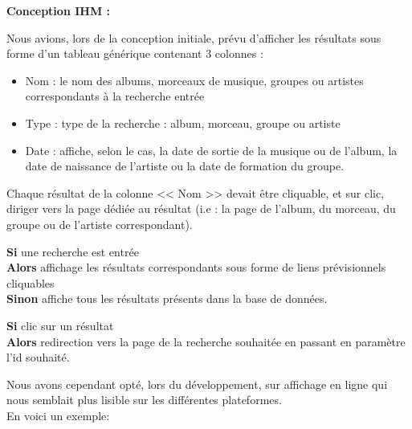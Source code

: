 			\begin{paragraphe}
				\textbf{Conception IHM :}
			\end{paragraphe}

			\begin{paragraphe}
			    Nous avions, lors de la conception initiale, prévu d'afficher les résultats sous forme d'un tableau générique contenant 3 colonnes :
				\begin{itemize}
					\item Nom : le nom des albums, morceaux de musique, groupes ou artistes correspondants à la recherche entrée
					\item Type : type de la recherche : album, morceau, groupe ou artiste
					\item Date : affiche, selon le cas, la date de sortie de la musique ou de l'album, la date de naissance de l'artiste ou la date de formation du groupe.
				\end{itemize}
				Chaque résultat de la colonne << Nom >> devait être cliquable, et sur clic, diriger vers la page dédiée au résultat (i.e : la page de l'album, du morceau, du groupe ou de l'artiste correspondant).
			\end{paragraphe}
            

            \begin{paragraphe}
                \textbf{Si} une recherche est entrée\\
                \textbf{Alors} affichage les résultats correspondants sous forme de liens prévisionnels cliquables\\
                \textbf{Sinon} affiche tous les résultats présents dans la base de données.
            \end{paragraphe}

            \begin{paragraphe}
                \textbf{Si} clic sur un résultat\\
                \textbf{Alors} redirection vers la page de la recherche souhaitée en passant en paramètre l'id souhaité.
            \end{paragraphe}

            \begin{paragraphe}
                Nous avons cependant opté, lors du développement, sur affichage en ligne qui nous semblait plus lisible sur les différentes plateformes.\\
                En voici un exemple:
            \end{paragraphe}
            
